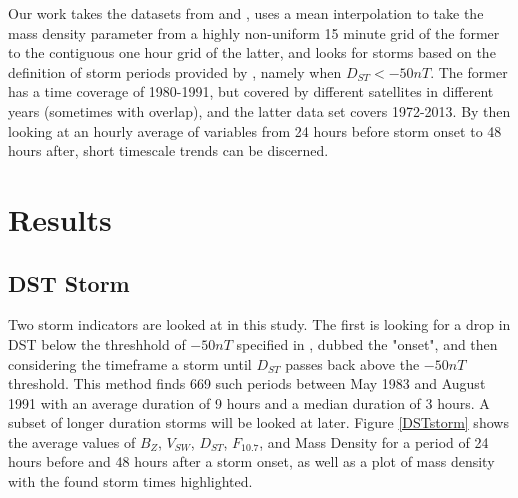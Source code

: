 \documentclass[10pt,twocolumn]{article}
\begin{document}
Our work takes the datasets from \cite{Denton} and \cite{Reconstruction}, uses a mean interpolation to take the mass density parameter from a highly non-uniform 15 minute grid of the former to the contiguous one hour grid of the latter, and looks for storms based on the definition of storm periods provided by \cite{Takahashi2010}, namely when $D_{ST}<-50nT$. The former has a time coverage of 1980-1991, but covered by different satellites in different years (sometimes with overlap), and the latter data set covers 1972-2013. By then looking at an hourly average of variables from 24 hours before storm onset to 48 hours after, short timescale trends can be discerned. 

\section{Results}


\subsection{DST Storm}
Two storm indicators are looked at in this study. The first is looking for a drop in DST below the threshhold of $-50nT$ specified in \cite{Takahashi2010}, dubbed the "onset", and then considering the timeframe a storm until $D_{ST}$ passes back above the $-50nT$ threshold. This method finds 669 such periods between May 1983 and August 1991 with an average duration of 9 hours and a median duration of 3 hours. A subset of longer duration storms will be looked at later. Figure \ref{DSTstorm} shows the average values of $B_Z$, $V_{SW}$, $D_{ST}$, $F_{10.7}$, and Mass Density for a period of 24 hours before and 48 hours after a storm onset, as well as a plot of mass density with the found storm times highlighted.
\end{document}
